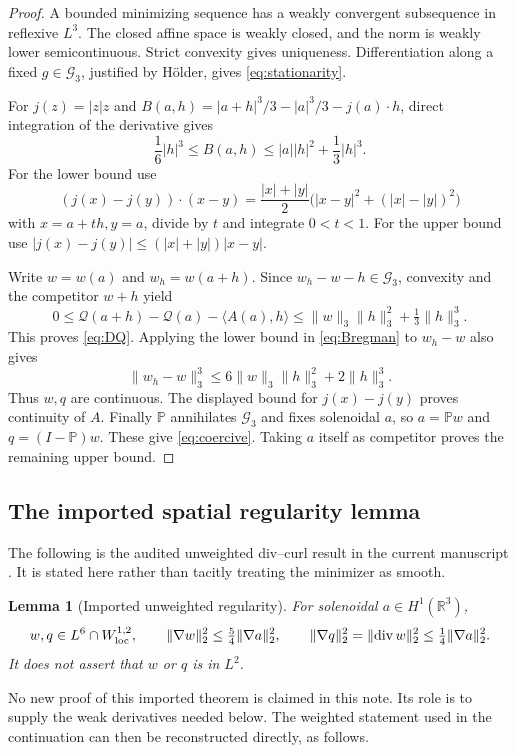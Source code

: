 \documentclass[11pt,a4paper]{article}
\newtheorem{lemma}[theorem]{Lemma}
\theoremstyle{definition}\newtheorem{definition}[theorem]{Definition}
\theoremstyle{remark}\newtheorem{remark}[theorem]{Remark}
\newcommand{\R}{\mathbb R}
\newcommand{\G}{\mathcal G_3}
\newcommand{\Q}{\mathcal Q}
\newcommand{\PP}{\mathbb P}
\newcommand{\norm}[1]{\lVert #1\rVert}
\newcommand{\ip}[2]{\langle #1,#2\rangle}
\newcommand{\diver}{\operatorname{div}}
\numberwithin{equation}{section}
\begin{document}
\begin{proof}
A bounded minimizing sequence has a weakly convergent subsequence in reflexive $L^3$. The closed affine space is weakly closed, and the norm is weakly lower semicontinuous. Strict convexity gives uniqueness. Differentiation along a fixed $g\in\G$, justified by H\"older, gives \eqref{eq:stationarity}.

For $j(z)=|z|z$ and
$B(a,h)=|a+h|^3/3-|a|^3/3-j(a)\cdot h$, direct integration of the derivative gives
\begin{equation}\label{eq:Bregman}
 \frac16|h|^3\le B(a,h)\le |a||h|^2+\frac13|h|^3.
\end{equation}
For the lower bound use
\[
 (j(x)-j(y))\cdot(x-y)
 =\frac{|x|+|y|}{2}\bigl(|x-y|^2+(|x|-|y|)^2\bigr)
\]
with $x=a+th,y=a$, divide by $t$ and integrate $0<t<1$. For the upper bound use $|j(x)-j(y)|\le(|x|+|y|)|x-y|$.

Write $w=w(a)$ and $w_h=w(a+h)$. Since $w_h-w-h\in\G$, convexity and the competitor $w+h$ yield
\begin{equation}\label{eq:Qremainder}
 0\le\Q(a+h)-\Q(a)-\ip{A(a)}h
 \le\norm w_3\norm h_3^2+\tfrac13\norm h_3^3.
\end{equation}
This proves \eqref{eq:DQ}. Applying the lower bound in \eqref{eq:Bregman} to $w_h-w$ also gives
\[
 \norm{w_h-w}_3^3\le6\norm w_3\norm h_3^2+2\norm h_3^3.
\]
Thus $w,q$ are continuous. The displayed bound for $j(x)-j(y)$ proves continuity of $A$. Finally $\PP$ annihilates $\G$ and fixes solenoidal $a$, so $a=\PP w$ and $q=(I-\PP)w$. These give \eqref{eq:coercive}. Taking $a$ itself as competitor proves the remaining upper bound.
\end{proof}

\subsection{The imported spatial regularity lemma}
The following is the audited unweighted div--curl result in the current manuscript \cite{Paper,Audit}. It is stated here rather than tacitly treating the minimizer as smooth.
\begin{lemma}[Imported unweighted regularity]\label{lem:import}
For solenoidal $a\in H^1(\R^3)$,
\begin{equation}\label{eq:unweighted}
 w,q\in L^6\cap W^{1,2}_{\rm loc},\qquad
 \norm{\nabla w}_2^2\le\tfrac54\norm{\nabla a}_2^2,\qquad
 \norm{\nabla q}_2^2=\norm{\diver w}_2^2\le\tfrac14\norm{\nabla a}_2^2.
\end{equation}
It does not assert that $w$ or $q$ is in $L^2$.
\end{lemma}
No new proof of this imported theorem is claimed in this note. Its role is to supply the weak derivatives needed below. The weighted statement used in the continuation can then be reconstructed directly, as follows.
\end{document}
